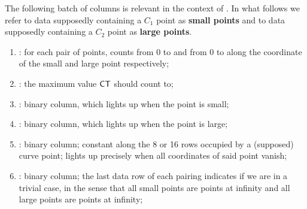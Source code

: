 The following batch of columns is relevant in the context of .
In what follows we refer to data supposedly containing a $C_1$ point as \textbf{small points} and to data supposedly containing a $C_2$ point as \textbf{large points}.
\begin{enumerate}[resume]
      \item \ct:
            for each pair of points, counts from 0 to \ctMaxSmallPoint{} and from 0 to \ctMaxLargePoint{} %
            along the coordinate of the small and large point respectively;
      \item \maxCt:
            the maximum value $\textsf{CT}$ should count to;
      \item \isSmallPoint:
            binary column, which lights up when the point is small;
      \item \isLargePoint:
            binary column, which lights up when the point is large;
      \item \isInfinity:
            binary column;
            constant along the 8 or 16 rows occupied by a (supposed) curve point;
            lights up precisely when all coordinates of said point vanish;
      \item \both{\trivialPairing}: binary column; the last data row of each pairing indicates if we are in a trivial case, in the sense that all small points are points at infinity and all large points are points at infinity;

\end{enumerate}
